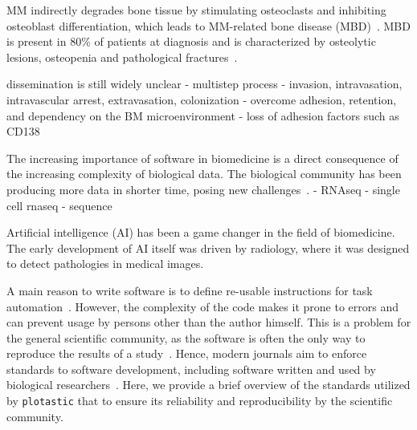 MM indirectly degrades bone tissue by stimulating osteoclasts and
inhibiting osteoblast differentiation, which leads to MM-related bone
disease (MBD)~\cite{glaveyProteomicCharacterizationHuman2017}. MBD is
present in 80\% of patients at diagnosis and is characterized by
osteolytic lesions, osteopenia and pathological
fractures~\cite{terposPathogenesisBoneDisease2018}.


dissemination is still widely unclear
- multistep process
- invasion, intravasation, intravascular arrest, extravasation,
colonization
- overcome adhesion, retention, and dependency on the BM
microenvironment
- loss of adhesion factors such as CD138

\newpage



The increasing importance of software in biomedicine is a direct
consequence of the increasing complexity of biological data. The
biological community has been producing more data in shorter time,
posing new challenges~\cite{yangScalabilityValidationBig2017}.
- RNAseq
- single cell rnaseq
- sequence

Artificial intelligence (AI) has been a game changer in the field of
biomedicine. The early development of AI itself was driven by radiology,
where it was designed to detect pathologies in medical images.


A main reason to write software is to define re-usable instructions for
task automation~\cite{narztReusabilityConceptProcess1998}. However, the
complexity of the code makes it prone to errors and can prevent usage by
persons other than the author himself. This is a problem for the general
scientific community, as the software is often the only way to reproduce
the results of a study~\cite{sandveTenSimpleRules2013}. Hence, modern
journals aim to enforce standards to software development, including
software written and used by biological
researchers~\cite{smithJournalOpenSource2018}. Here, we provide a brief
overview of the standards utilized by \texttt{plotastic} that to ensure
its reliability and reproducibility by the scientific community.

